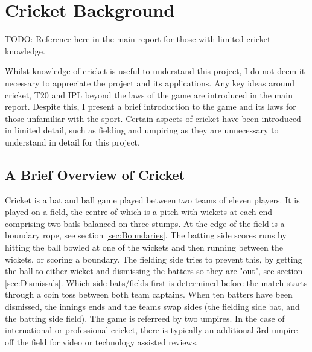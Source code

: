 \documentclass[12pt,a4paper]{report}
\theoremstyle{definition}
\begin{document}


\appendix


\chapter{Cricket Background} \label{chap:CrickBackground}

TODO: Reference here in the main report for those with limited cricket knowledge.

Whilst knowledge of cricket is useful to understand this project, I do not deem it necessary to appreciate the project and its applications.
Any key ideas around cricket, T20 and IPL beyond the laws of the game are introduced in the main report.
Despite this, I present a brief introduction to the game and its laws for those unfamiliar with the sport.
Certain aspects of cricket have been introduced in limited detail, such as fielding and umpiring as they are unnecessary to understand in detail for this project.

\section{A Brief Overview of Cricket}

Cricket is a bat and ball game played between two teams of eleven players. 
It is played on a field, the centre of which is a pitch with wickets at each end comprising two bails balanced on three stumps. 
At the edge of the field is a boundary rope, see section \ref{sec:Boundaries}. 
The batting side scores runs by hitting the ball bowled at one of the wickets and then running between the wickets, or scoring a boundary.
The fielding side tries to prevent this, by getting the ball to either wicket and dismissing the batters so they are "out", see section \ref{sec:Dismissals}.
Which side bats/fields first is determined before the match starts through a coin toss between both team captains.
When ten batters have been dismissed, the innings ends and the teams swap sides (the fielding side bat, and the batting side field).
The game is referreed by two umpires.
In the case of international or professional cricket, there is typically an additional 3rd umpire off the field for video or technology assisted reviews.
\end{document}

